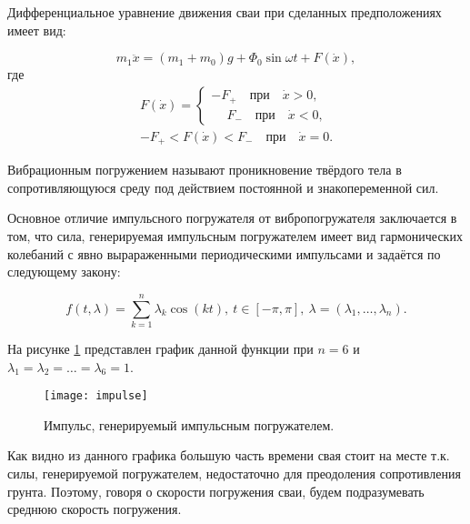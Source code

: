 Дифференциальное уравнение движения сваи при сделанных предположениях имеет вид:

\begin{equation}
    m_1\ddot{x} = (m_1 + m_0)g + \Phi_0 \sin \omega t + F(\dot{x}),
\end{equation}
где
\begin{equation}
    \begin{aligned}
        F(\dot{x}) =
        \begin{cases}
            -F_+ \quad \text{при} \quad \dot{x} > 0,\\
            \phantom{-}F_- \quad \text{при} \quad \dot{x} < 0,
        \end{cases}\\
        -F_+ < F(\dot{x}) < F_- \quad \text{при} \quad \dot{x} = 0.
    \end{aligned}
\end{equation}

\begin{definition}
    Вибрационным погружением называют проникновение твёрдого тела в сопротивляющуюся среду
    под действием постоянной и знакопеременной сил.
\end{definition}

\noindent Основное отличие импульсного погружателя от вибропогружателя заключается в том, что сила, генерируемая
импульсным погружателем имеет вид гармонических колебаний с явно вырараженными периодическими импульсами и задаётся
по следующему закону:

\begin{equation}
    f(t,\lambda)=\sum_{k=1}^n \lambda_k\cos(kt),\ t\in [-\pi,\pi],\ \lambda =(\lambda_1, \ldots,\lambda_n).
\end{equation}

\noindent На рисунке \ref{fig:impulse} представлен график данной функции при $n = 6$ и
$\lambda_1 = \lambda_2 = \ldots = \lambda_6 = 1$.

\begin{figure}[h]
    \centering
    \texttt{[image: impulse]}
    \caption{Импульс, генерируемый импульсным погружателем.}
    \label{fig:impulse}
\end{figure}

\noindent Как видно из данного графика большую часть времени свая стоит на месте т.к. силы, генерируемой погружателем,
недостаточно для преодоления сопротивления грунта. Поэтому, говоря о скорости погружения сваи, будем подразумевать среднюю
скорость погружения.

